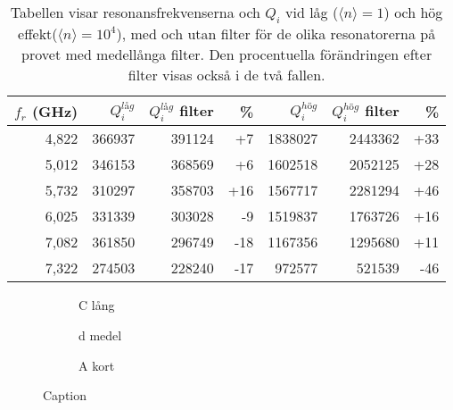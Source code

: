 \documentclass[main.tex]{subfiles}
\begin{document}
\begin{table}[h]
\centering
\caption{Tabellen visar resonansfrekvenserna och $Q_i$ vid låg ($\langle n\rangle=1$) och hög effekt($\langle n\rangle=10^4$), med och utan filter för de olika resonatorerna på provet med medellånga filter. Den procentuella förändringen efter filter visas också i de två fallen.}
\label{tab:Qi_d}
\begin{tabular}{rrrrrrr}
\toprule
$f_r$ (\unit{GHz}) & $Q_i^{låg}$ & $Q_i^{låg}$ filter & \% & $Q_i^{hög}$ & $Q_i^{hög}$ filter & \% \\
\midrule
4,822 & 366937 & 391124 & +7 & 1838027 & 2443362 & +33 \\
5,012 & 346153 & 368569 & +6 & 1602518 & 2052125 & +28 \\
5,732 & 310297 & 358703 & +16 & 1567717 & 2281294 & +46 \\
6,025 & 331339 & 303028 & -9 & 1519837 & 1763726 & +16 \\
7,082 & 361850 & 296749 & -18 & 1167356 & 1295680 & +11 \\
7,322 & 274503 & 228240 & -17 & 972577 & 521539 & -46 \\
\bottomrule
\end{tabular}
\end{table}






\begin{figure}
    \begin{subfigure}{0.5\textwidth}
    \centering
    \setlength{}
    \setlength\figureheight{11em}
    
    \caption{C lång}
    \end{subfigure}
    \begin{subfigure}{0.5\textwidth}
    \centering
    \setlength{}
    \setlength\figureheight{11em}
    
    \caption{d medel}
    \end{subfigure}
    \begin{center}
    \begin{subfigure}{0.75\textwidth}
    \centering
    \setlength{}
    \setlength\figureheight{11em}
    
    \caption{A kort}
    \end{subfigure}
    \end{center}
    \caption{Caption}
    \label{fig:my_label}
\end{figure}
\end{document}
